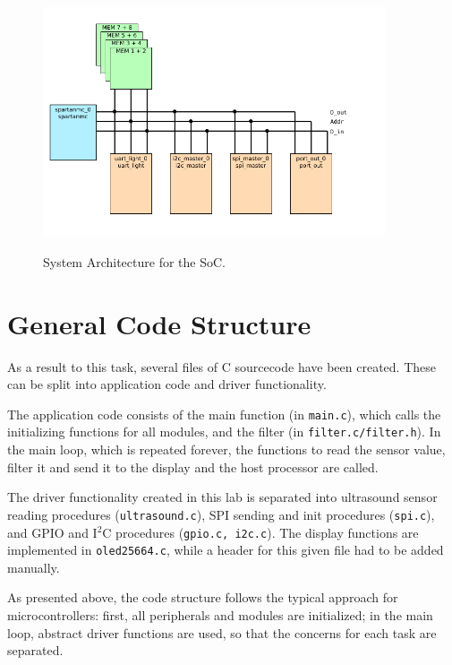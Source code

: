 \begin{figure}
    \centering
    \includegraphics[width=0.9\textwidth]{images/SystemOverview.png}
    \label{fig:SystemArchitecture}
    \caption{System Architecture for the SoC.}
\end{figure}

\section{General Code Structure}
\label{sec:generalCodeStructure}
As a result to this task, several files of C sourcecode have been created. These 
can be split into application code and driver functionality.

The application code consists of the main function (in \texttt{main.c}), which calls
the initializing functions for all modules, and the filter (in \texttt{filter.c/filter.h}).
In the main loop, which is repeated forever, the functions to read the sensor value,
filter it and send it to the display and the host processor are called.

The driver functionality created in this lab is separated into ultrasound sensor reading
procedures (\texttt{ultrasound.c}), SPI sending and init procedures (\texttt{spi.c}), and 
GPIO and I$^{2}$C procedures (\texttt{gpio.c, i2c.c}). The display functions are implemented
in \texttt{oled25664.c}, while a header for this given file had to be added manually.

As presented above, the code structure follows the typical approach for microcontrollers:
first, all peripherals and modules are initialized; in the main loop, abstract driver 
functions are used, so that the concerns for each task are separated.